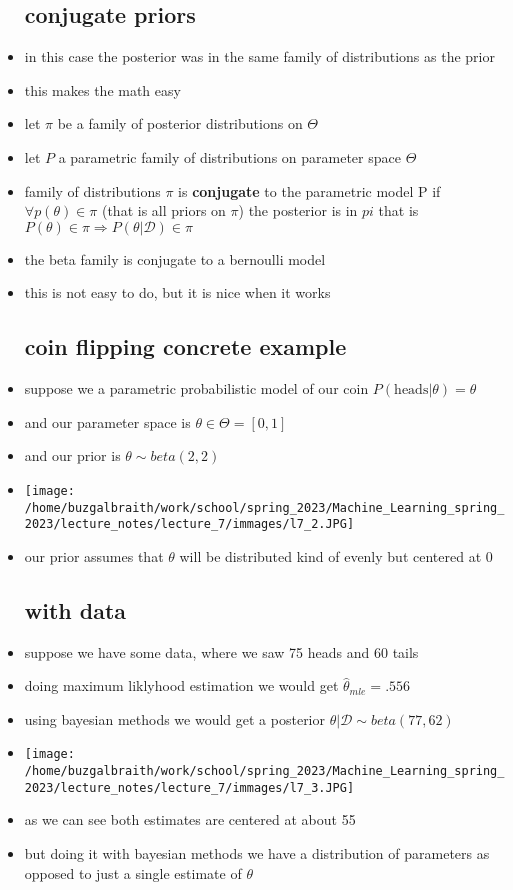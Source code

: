 \documentclass{article}
\begin{document}
\begin{itemize}
\subsection*{conjugate priors}
\item in this case the posterior was in the same family of distributions as the prior 
\item this makes the math easy 
\item let $\pi$ be a family of posterior distributions on $\Theta$
\item let $P$ a parametric family of distributions on parameter space $\Theta$
\item family of distributions $\pi$ is  \textbf{conjugate} to the parametric model P if $\forall p(\theta) \in \pi$ (that is all priors on $\pi$) the posterior is in $pi$ that is $P(\theta)\in \pi\Rightarrow P(\theta|\mathcal{D})\in \pi$
\item the beta family is conjugate to a bernoulli model 
\item this is not easy to do, but it is nice when it works 
\subsection*{coin flipping concrete example}
\item suppose we a parametric probabilistic model of our coin $P(\text{heads}|\theta)=\theta$
\item and our parameter space is $\theta\in \Theta=[0,1]$
\item and our prior is $\theta\sim beta(2,2)$
\item \texttt{[image: /home/buzgalbraith/work/school/spring\_2023/Machine\_Learning\_spring\_2023/lecture\_notes/lecture\_7/immages/l7\_2.JPG]}
\item our prior assumes that $\theta$ will be distributed kind of evenly but centered at 0
\subsection*{with data}
\item suppose we have some data, where we saw 75 heads and 60 tails 
\item doing maximum liklyhood estimation we would get $\hat{\theta}_{mle}=.556$
\item using bayesian methods we would get a posterior $\theta|\mathcal{D}\sim beta(77,62)$
\item \texttt{[image: /home/buzgalbraith/work/school/spring\_2023/Machine\_Learning\_spring\_2023/lecture\_notes/lecture\_7/immages/l7\_3.JPG]}
\item as we can see both estimates are centered at about 55
\item but doing it with bayesian methods we have a distribution of parameters as opposed to just a single estimate of $\theta$

\end{itemize}
\end{document}
